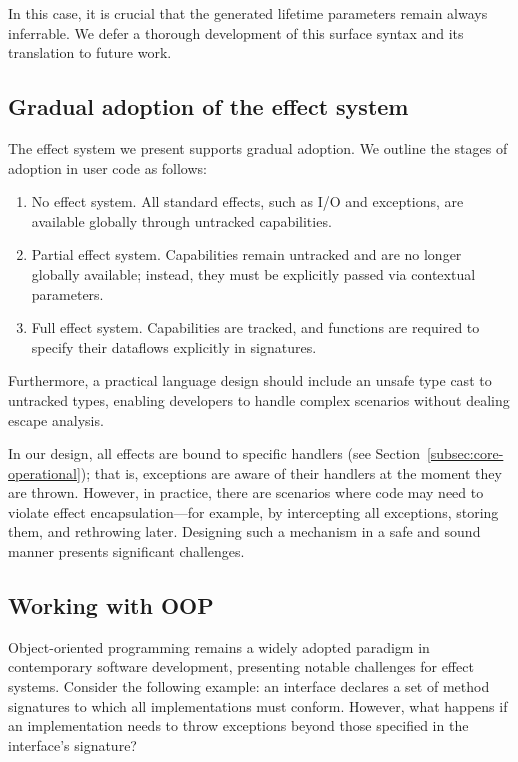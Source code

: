 \documentclass[acmsmall,review,screen]{acmart}
\begin{document}
In this case, it is crucial that the generated lifetime parameters remain always inferrable.
We defer a thorough development of this surface syntax and its translation to future work.

\subsection{Gradual adoption of the effect system}

The effect system we present supports gradual adoption.
We outline the stages of adoption in user code as follows:
\begin{enumerate}
    \item No effect system.
    All standard effects, such as I/O and exceptions, are available globally through untracked capabilities.
    \item Partial effect system.
    Capabilities remain untracked and are no longer globally available; instead, they must be explicitly passed via contextual parameters.
    \item Full effect system.
    Capabilities are tracked, and functions are required to specify their dataflows explicitly in signatures.
\end{enumerate}

Furthermore, a practical language design should include an unsafe type cast to untracked types, enabling developers to handle complex scenarios without dealing escape analysis.

In our design, all effects are bound to specific handlers (see Section~\ref{subsec:core-operational}); that is, exceptions are aware of their handlers at the moment they are thrown.
However, in practice, there are scenarios where code may need to violate effect encapsulation—for example, by intercepting all exceptions, storing them,
 and rethrowing later.
Designing such a mechanism in a safe and sound manner presents significant challenges.

\subsection{Working with OOP} \label{subsec:oop}

Object-oriented programming remains a widely adopted paradigm in contemporary software development, presenting notable challenges for effect systems.
Consider the following example: an interface declares a set of method signatures to which all implementations must conform.
However, what happens if an implementation needs to throw exceptions beyond those specified in the interface’s signature?
\end{document}
